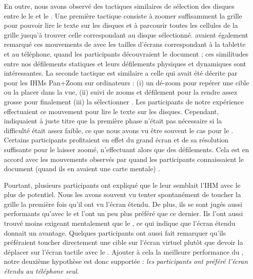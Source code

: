 En outre, nous avons observé des tactiques similaires de sélection des disques entre le le  et le . Une première tactique consiste à zoomer suffisamment la grille pour pouvoir lire le texte sur les disques et à parcourir toutes les cellules de la grille jusqu'à trouver celle correspondant au disque sélectionné. \cite{Raedle2014} avaient également remarqué ces mouvements de   avec les tailles d'écrans correspondant à la tablette et au téléphone, quand les participants découvraient le document ; ces similitudes entre nos défilements statiques et leurs défilements physiques et dynamiques sont intéressantes. La seconde tactique est similaire a celle qui avait été décrite par \cite{Guiard2004} pour les IHMs Pan+Zoom sur ordinateurs : (i) un dé-zoom pour repérer une cible ou la placer dans la vue, (ii) suivi de zooms et défilement pour la rendre assez grosse pour finalement (iii) la sélectionner . Les participants de notre expérience effectuaient ce mouvement pour lire le texte sur les disques. Cependant, \cite{Guiard2004} indiquaient à juste titre que la première phase n'était pas nécessaire si la difficulté était assez faible, ce que nous avons vu être souvent le cas pour le . Certains participants profitaient en effet du grand écran et de sa résolution suffisante pour le laisser zoomé, n'effectuant alors que des défilements. Cela est en accord avec les mouvements observés par \cite{Raedle2014} quand les participants connaissaient le document (quand ils en avaient une carte mentale) .

Pourtant, plusieurs participants ont expliqué que le  leur semblait l'IHM avec le plus de potentiel. Nous les avons souvent vu tenter spontanément de toucher la grille la première fois qu'il ont vu l'écran étendu. De plus, ils se sont jugés aussi performants qu'avec le  et l'ont un peu plus préféré que ce dernier. Ils l'ont aussi trouvé moins exigeant mentalement que le , ce qui indique que l'écran étendu donnait un avantage. Quelques participants ont aussi fait remarquer qu'ils préféraient toucher directement une cible sur l'écran virtuel plutôt que devoir la déplacer sur l'écran tactile avec le . Ajouter à cela la meilleure performance du , notre deuxième hypothèse est donc supportée : \emph{les participants ont préféré l'écran étendu au téléphone seul}.

